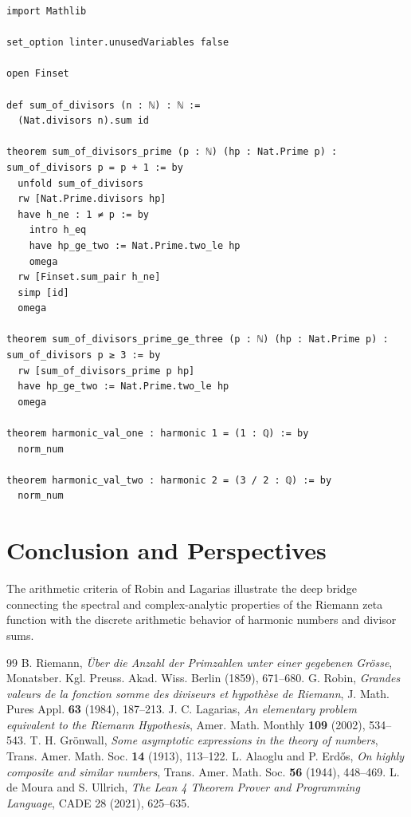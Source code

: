\documentclass[11pt,a4paper]{article}
\theoremstyle{definition}
\begin{document}
\begin{lstlisting}[caption={Formal Lean 4 Implementation of Divisor Sums and Harmonic Criteria}]
import Mathlib

set_option linter.unusedVariables false

open Finset

def sum_of_divisors (n : ℕ) : ℕ :=
  (Nat.divisors n).sum id

theorem sum_of_divisors_prime (p : ℕ) (hp : Nat.Prime p) : sum_of_divisors p = p + 1 := by
  unfold sum_of_divisors
  rw [Nat.Prime.divisors hp]
  have h_ne : 1 ≠ p := by
    intro h_eq
    have hp_ge_two := Nat.Prime.two_le hp
    omega
  rw [Finset.sum_pair h_ne]
  simp [id]
  omega

theorem sum_of_divisors_prime_ge_three (p : ℕ) (hp : Nat.Prime p) : sum_of_divisors p ≥ 3 := by
  rw [sum_of_divisors_prime p hp]
  have hp_ge_two := Nat.Prime.two_le hp
  omega

theorem harmonic_val_one : harmonic 1 = (1 : ℚ) := by
  norm_num

theorem harmonic_val_two : harmonic 2 = (3 / 2 : ℚ) := by
  norm_num
\end{lstlisting}

\section{Conclusion and Perspectives}
The arithmetic criteria of Robin and Lagarias illustrate the deep bridge connecting the spectral and complex-analytic properties of the Riemann zeta function with the discrete arithmetic behavior of harmonic numbers and divisor sums.

\begin{thebibliography}{99}
 B. Riemann, \textit{\"Uber die Anzahl der Primzahlen unter einer gegebenen Gr\"osse}, Monatsber. Kgl. Preuss. Akad. Wiss. Berlin (1859), 671--680.
 G. Robin, \textit{Grandes valeurs de la fonction somme des diviseurs et hypoth\`ese de Riemann}, J. Math. Pures Appl. \textbf{63} (1984), 187--213.
 J. C. Lagarias, \textit{An elementary problem equivalent to the Riemann Hypothesis}, Amer. Math. Monthly \textbf{109} (2002), 534--543.
 T. H. Gr\"onwall, \textit{Some asymptotic expressions in the theory of numbers}, Trans. Amer. Math. Soc. \textbf{14} (1913), 113--122.
 L. Alaoglu and P. Erd\H{o}s, \textit{On highly composite and similar numbers}, Trans. Amer. Math. Soc. \textbf{56} (1944), 448--469.
 L. de Moura and S. Ullrich, \textit{The Lean 4 Theorem Prover and Programming Language}, CADE 28 (2021), 625--635.
\end{thebibliography}
\end{document}
